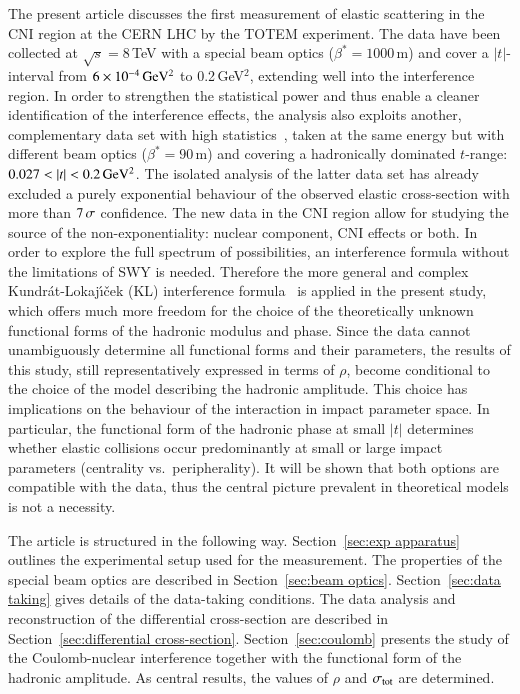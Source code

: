 The present article discusses the first measurement of elastic scattering in the CNI region at the CERN LHC by the TOTEM experiment. The data have been collected at $\sqrt{s} = 8\,$TeV with a special beam optics ($\beta^{*}=1000\,$m) and cover a $|t|$-interval from $6\times10^{-4}\,\rm GeV^{2}$ to 0.2\,GeV$^{2}$, extending well into the interference region. In order to strengthen the statistical power and thus enable a cleaner identification of the interference effects, the analysis also exploits another, complementary data set with high statistics~\cite{8tev-90m}, taken at the same energy but with different beam optics ($\beta^{*}=90\,$m) and covering a hadronically dominated $t$-range: $0.027 < |t| < 0.2\,{\rm GeV^2}$. The isolated analysis of the latter data set has already excluded a purely exponential behaviour of the observed elastic cross-section with more than $7\,{\rm \sigma}$ confidence. The new data in the CNI region allow for studying the source of the non-exponentiality: nuclear component, CNI effects or both. In order to explore the full spectrum of possibilities, an interference formula without the limitations of SWY is needed. Therefore the more general and complex Kundr\'{a}t-Lokaj\'{\i}\v{c}ek (KL) interference formula~\cite{kl94} is applied in the present study, which offers much more freedom for the choice of the theoretically unknown functional forms of the hadronic modulus and phase. Since the data cannot unambiguously determine all functional forms and their parameters, the results of this study, still representatively expressed in terms of $\rho$, become conditional to the choice of the model describing the hadronic amplitude. This choice has implications on the behaviour of the interaction in impact parameter space. In particular, the functional form of the hadronic phase at small $|t|$ determines whether elastic collisions occur predominantly at small or large impact parameters (centrality vs.~peripherality). It will be shown that both options are compatible with the data, thus the central picture prevalent in theoretical models is not a necessity.

The article is structured in the following way. Section~\ref{sec:exp apparatus} outlines the experimental setup used for the measurement. The properties of the special beam optics are described in Section~\ref{sec:beam optics}. Section~\ref{sec:data taking} gives details of the data-taking conditions. The data analysis and reconstruction of the differential cross-section are described in Section~\ref{sec:differential cross-section}. Section~\ref{sec:coulomb} presents the study of the Coulomb-nuclear interference together with the functional form of the hadronic amplitude. As central
results, the values of $\rho$ and $\sigma_{\rm tot}$ are determined.
